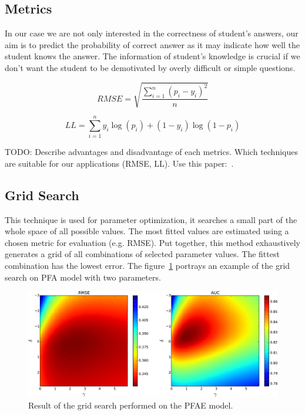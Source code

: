 \subsection{Metrics}

In our case we are not only interested in the correctness of student's answers, our aim is to predict the probability of correct answer as it may indicate how well the student knows the answer. The information of student's knowledge is crucial if we don't want the student to be demotivated by overly difficult or simple questions.

\begin{equation} \label{rmse}
  RMSE = \sqrt{\frac{\sum_{i=1}^n (p_i - y_i)^2}{n}}
\end{equation}

\begin{equation} \label{ll}
  LL = \sum_{i=1}^n y_i \log(p_i) + (1 - y_i) \log(1 - p_i)
\end{equation}

TODO: Describe advantages and disadvantage of each metrics. Which techniques are suitable for our applications (RMSE, LL). Use this paper:~\cite{Pelanek2015a}.

\subsection{Grid Search}

This technique is used for parameter optimization, it searches a small part of the whole space of all possible values. The most fitted values are estimated using a chosen metric for evaluation (e.g. RMSE). Put together, this method exhaustively generates a grid of all combinations of selected parameter values. The fittest combination has the lowest error. The figure~\ref{fig-grid-search-rmse-auc} portrays an example of the grid search on PFA model with two parameters.

\begin{figure}[htbp]
  \centering
  \includegraphics[width=\textwidth]{img/pfa-grid-search-rmse-auc}
  \caption{Result of the grid search performed on the PFAE model.}
  \label{fig-grid-search-rmse-auc}
\end{figure}

